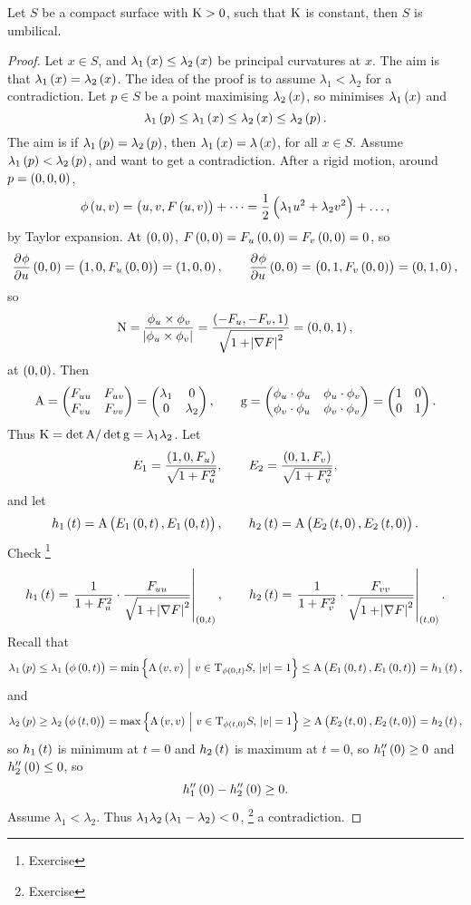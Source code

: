 
\begin{theorem}
Let $ S $ be a compact surface with $ \mathrm{K} > 0 $, such that $ \mathrm{K} $ is constant, then $ S $ is umbilical.
\end{theorem}

\begin{proof}
Let $ x \in S $, and $ \lambda_1\br{x} \le \lambda_2\br{x} $ be principal curvatures at $ x $. The aim is that $ \lambda_1\br{x} = \lambda_2\br{x} $. The idea of the proof is to assume $ \lambda_1 < \lambda_2 $ for a contradiction. Let $ p \in S $ be a point maximising $ \lambda_2\br{x} $, so minimises $ \lambda_1\br{x} $ and
$$ \lambda_1\br{p} \le \lambda_1\br{x} \le \lambda_2\br{x} \le \lambda_2\br{p}. $$
The aim is if $ \lambda_1\br{p} = \lambda_2\br{p} $, then $ \lambda_1\br{x} = \lambda\br{x} $, for all $ x \in S $. Assume $ \lambda_1\br{p} < \lambda_2\br{p} $, and want to get a contradiction. After a rigid motion, around $ p = \br{0, 0, 0} $,
$$ \phi\br{u, v} = \br{u, v, F\br{u, v}} + \dots = \dfrac{1}{2}\br{\lambda_1u^2 + \lambda_2v^2} + \dots, $$
by Taylor expansion. At $ \br{0, 0} $, $ F\br{0, 0} = F_u\br{0, 0} = F_v\br{0, 0} = 0 $, so
$$ \dpd{\phi}{u}\br{0, 0} = \br{1, 0, F_u\br{0, 0}} = \br{1, 0, 0}, \qquad \dpd{\phi}{u}\br{0, 0} = \br{0, 1, F_v\br{0, 0}} = \br{0, 1, 0}, $$
so
$$ \N = \dfrac{\phi_u \times \phi_v}{\abs{\phi_u \times \phi_v}} = \dfrac{\br{-F_u, -F_v, 1}}{\sqrt{1 + \abs{\nabla F}^2}} = \br{0, 0, 1}, $$
at $ \br{0, 0} $. Then
$$ \mathrm{A} = \begin{pmatrix} F_{uu} & F_{uv} \\ F_{vu} & F_{vv} \end{pmatrix} = \begin{pmatrix} \lambda_1 & 0 \\ 0 & \lambda_2 \end{pmatrix}, \qquad \mathrm{g} = \begin{pmatrix} \phi_u \cdot \phi_u & \phi_u \cdot \phi_v \\ \phi_v \cdot \phi_u & \phi_v \cdot \phi_v \end{pmatrix} = \begin{pmatrix} 1 & 0 \\ 0 & 1 \end{pmatrix}. $$
Thus $ \mathrm{K} = \det \mathrm{A} / \det \mathrm{g} = \lambda_1\lambda_2 $. Let
$$ E_1 = \dfrac{\br{1, 0, F_u}}{\sqrt{1 + F_u^2}}, \qquad E_2 = \dfrac{\br{0, 1, F_v}}{\sqrt{1 + F_v^2}}, $$
and let
$$ h_1\br{t} = \A\br{E_1\br{0, t}, E_1\br{0, t}}, \qquad h_2\br{t} = \A\br{E_2\br{t, 0}, E_2\br{t, 0}}. $$
Check \footnote{Exercise}
$$ h_1\br{t} = \eval{\dfrac{1}{1 + F_u^2} \cdot \dfrac{F_{uu}}{\sqrt{1 + \abs{\nabla F}^2}}}_{\br{0, t}}, \qquad h_2\br{t} = \eval{\dfrac{1}{1 + F_v^2} \cdot \dfrac{F_{vv}}{\sqrt{1 + \abs{\nabla F}^2}}}_{\br{t, 0}}. $$
Recall that
$$ \lambda_1\br{p} \le \lambda_1\br{\phi\br{0, t}} = \min\cbr{\A\br{v, v} \st v \in \T_{\phi\br{0, t}} S, \ \abs{v} = 1} \le \A\br{E_1\br{0, t}, E_1\br{0, t}} = h_1\br{t}, $$
and
$$ \lambda_2\br{p} \ge \lambda_2\br{\phi\br{t, 0}} = \max\cbr{\A\br{v, v} \st v \in \T_{\phi\br{t, 0}} S, \ \abs{v} = 1} \ge \A\br{E_2\br{t, 0}, E_2\br{t, 0}} = h_2\br{t}, $$
so $ h_1\br{t} $ is minimum at $ t = 0 $ and $ h_2\br{t} $ is maximum at $ t = 0 $, so $ h_1''\br{0} \ge 0 $ and $ h_2''\br{0} \le 0 $, so
$$ h_1''\br{0} - h_2''\br{0} \ge 0. $$
Assume $ \lambda_1 < \lambda_2 $. Thus $ \lambda_1\lambda_2\br{\lambda_1 - \lambda_2} < 0 $, \footnote{Exercise} a contradiction.
\end{proof}


